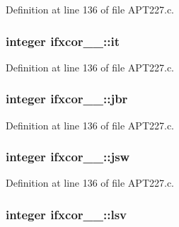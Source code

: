 Definition at line 136 of file A\+P\+T227.\+c.

\subsubsection[{\texorpdfstring{it}{it}}]{\setlength{\rightskip}{0pt plus 5cm}integer ifxcor\+\_\+\_\+\+::it}\hypertarget{structifxcor__1___ad001ec7d64334a04868d97cc356ae1b5}{}\label{structifxcor__1___ad001ec7d64334a04868d97cc356ae1b5}


Definition at line 136 of file A\+P\+T227.\+c.

\subsubsection[{\texorpdfstring{jbr}{jbr}}]{\setlength{\rightskip}{0pt plus 5cm}integer ifxcor\+\_\+\_\+\+::jbr}\hypertarget{structifxcor__1___a4172cf5755c02d3d1540ac68e3cd431e}{}\label{structifxcor__1___a4172cf5755c02d3d1540ac68e3cd431e}


Definition at line 136 of file A\+P\+T227.\+c.

\subsubsection[{\texorpdfstring{jsw}{jsw}}]{\setlength{\rightskip}{0pt plus 5cm}integer ifxcor\+\_\+\_\+\+::jsw}\hypertarget{structifxcor__1___a6be783807adddcab6265b96a65a03b93}{}\label{structifxcor__1___a6be783807adddcab6265b96a65a03b93}


Definition at line 136 of file A\+P\+T227.\+c.

\subsubsection[{\texorpdfstring{lsv}{lsv}}]{\setlength{\rightskip}{0pt plus 5cm}integer ifxcor\+\_\+\_\+\+::lsv}\hypertarget{structifxcor__1___a6aba7a8cfbcfbc50beeee2eb99b14368}{}\label{structifxcor__1___a6aba7a8cfbcfbc50beeee2eb99b14368}


